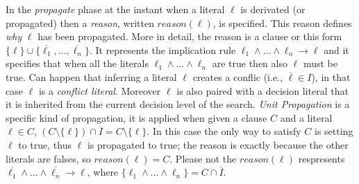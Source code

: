 In the \textit{propagate} phase at the instant when a literal $\ell$ is derivated 
(or propagated) then a \textit{reason}, written $\mathit{reason}(\ell)$, 
is specified. This reason defines \textit{why} $\ell$ has been propagated.
More in detail, the reason is a clause or this form 
$\{ \ell \} \cup \{\overline{\ell_1},\hdots, \overline{\ell_n}\}$. It represents the implication 
rule $\ell_1 \land \hdots \land \ell_n \rightarrow \ell$ and it specifies 
that when all the literals $\ell_1 \land \hdots \land \ell_n$ are true then also 
$\ell$ must be true.
Can happen that inferring a literal $\ell$ creates a conflic (i.e., $\overline{\ell} \in I$),
in that case $\ell$ is a \textit{conflict literal}.
Moreover $\ell$ is also paired with a decision literal 
that it is inherited from the current decision level of the search.
\textit{Unit Propagation} is a specific kind of propagation, it is applied when given a clause 
$C$ and a literal $\ell \in C $, $(C \setminus \{\ell\}) \cap \overline{I} = C \setminus \{\ell\}$.
In this case the only way to satisfy $C$ is setting $\ell$ to true, thus $\ell$
is propagated to true; the reason is exactly because the other literals are falses, so 
$reason(\ell) = C$.
Please not the $reason(\ell)$ respresents $\overline{\ell_1} \land \hdots \land \overline{\ell_n} \rightarrow \ell$, where 
$\{\ell_1 \land \hdots \land \ell_n\} = C \cap \overline{I}$.

